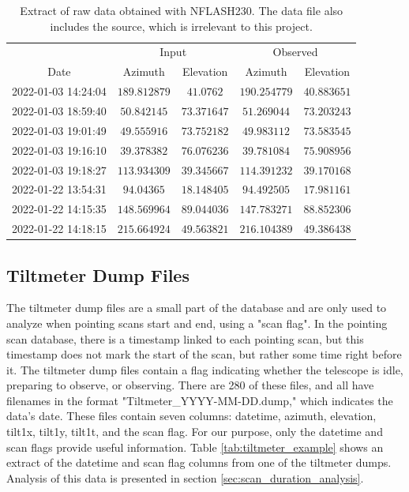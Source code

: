 \begin{table}[!htbp]
    \centering
    \caption[Raw NFLASH230 data]{Extract of raw data obtained with NFLASH230. The data file also includes the source, which is irrelevant to this project.}
    \begin{tabular}{ccccc}
        \toprule
         & \multicolumn{2}{c}{Input} & \multicolumn{2}{c}{Observed} \\ 
        \cline{2-3} \cline{4-5}
        Date & Azimuth & Elevation & Azimuth & Elevation \\ 
        \hline
        2022-01-03 14:24:04 & $189.812879$ & $41.0762$ & $190.254779$ & $40.883651$ \\
        2022-01-03 18:59:40 & $50.842145$ & $73.371647$ & $51.269044$ & $73.203243$ \\
        2022-01-03 19:01:49 & $49.555916$ & $73.752182$ & $49.983112$ & $73.583545$ \\
        2022-01-03 19:16:10 & $39.378382$ & $76.076236$ & $39.781084$ & $75.908956$ \\
        2022-01-03 19:18:27 & $113.934309$ & $39.345667$ & $114.391232$ & $39.170168$ \\
        2022-01-22 13:54:31 & $94.04365$ & $18.148405$ & $94.492505$ & $17.981161$ \\
        2022-01-22 14:15:35 & $148.569964$ & $89.044036$ & $147.783271$ & $88.852306$ \\
        2022-01-22 14:18:15 & $215.664924$ & $49.563821$ & $216.104389$ & $49.386438$ \\
        \bottomrule
    \end{tabular}
    \label{tab:raw_datanflash230}
    \end{table}




\subsection{Tiltmeter Dump Files}
The tiltmeter dump files are a small part of the database and are only used to analyze when pointing scans start and end, using a "scan flag".
In the pointing scan database, there is a timestamp linked to each pointing scan, but this timestamp does not mark the start of the scan, but rather some time right before it.
The tiltmeter dump files contain a flag indicating whether the telescope is idle, preparing to observe, or observing.
There are 280 of these files, and all have filenames in the format "Tiltmeter\_YYYY-MM-DD.dump," which indicates the data's date.
These files contain seven columns: datetime, azimuth, elevation, tilt1x, tilt1y, tilt1t, and the scan flag.
For our purpose, only the datetime and scan flags provide useful information.
Table \ref{tab:tiltmeter_example} shows an extract of the datetime and scan flag columns from one of the tiltmeter dumps.
Analysis of this data is presented in section \ref{sec:scan_duration_analysis}.


